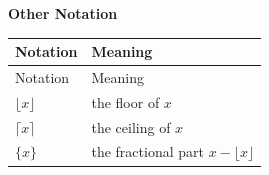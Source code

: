     \newpage

    \noindent\textbf{Other Notation}

    \vspace{0.5em}

    {\small
    \renewcommand{\arraystretch}{1.18}
    \begin{longtable}{@{}L{0.27\textwidth}L{0.65\textwidth}@{}}
        \toprule
        Notation & Meaning \\
        \midrule
        \endfirsthead

        \toprule
        Notation & Meaning \\
        \midrule
        \endhead

        \bottomrule
        \endlastfoot

        $\lfloor x\rfloor$ & the floor of $x$ \\
        $\lceil x\rceil$ & the ceiling of $x$ \\
        $\{x\}$ & the fractional part $x-\lfloor x\rfloor$ \\
    \end{longtable}
    }
